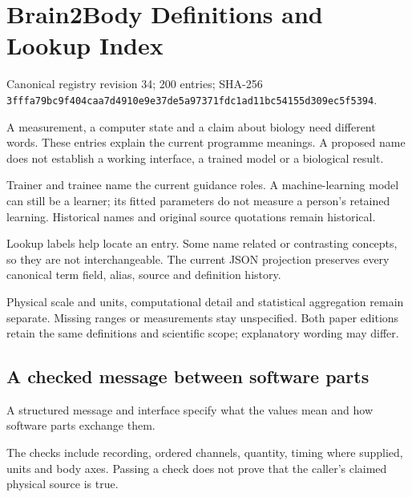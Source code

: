 \section*{Brain2Body Definitions and Lookup Index}
\noindent Canonical registry revision 34; 200 entries; SHA-256 \texttt{3fffa79b\allowbreak{}c9f404ca\allowbreak{}a7d4910e\allowbreak{}9e37de5a\allowbreak{}97371fdc\allowbreak{}1ad11bc5\allowbreak{}4155d309\allowbreak{}ec5f5394}.\par
\noindent A measurement, a computer state and a claim about biology need different words. These entries explain the current programme meanings. A proposed name does not establish a working interface, a trained model or a biological result.\par
\noindent Trainer and trainee name the current guidance roles. A machine-learning model can still be a learner; its fitted parameters do not measure a person's retained learning. Historical names and original source quotations remain historical.\par
\noindent Lookup labels help locate an entry. Some name related or contrasting concepts, so they are not interchangeable. The current JSON projection preserves every canonical term field, alias, source and definition history.\par
\noindent Physical scale and units, computational detail and statistical aggregation remain separate. Missing ranges or measurements stay unspecified. Both paper editions retain the same definitions and scientific scope; explanatory wording may differ.\par

\begin{samepage}
\subsection*{A checked message between software parts}
\noindent A structured message and interface specify what the values mean and how software parts exchange them.\par
\end{samepage}
\begin{samepage}
\noindent The checks include recording, ordered channels, quantity, timing where supplied, units and body axes. Passing a check does not prove that the caller’s claimed physical source is true.\par\nopagebreak[4]

\end{samepage}


